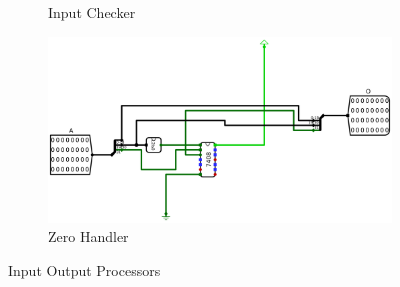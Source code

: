 \documentclass[12pt]{article}
\begin{document}
\begin{figure}[H]
\begin{subfigure}[b]{0.45\textwidth}
        \caption{Input Checker}
        \label{fig:inpcheck}
    \end{subfigure}
    \begin{subfigure}[b]{0.45\textwidth}
        \includegraphics[width=\textwidth]{Images/0handler.png}
        \caption{Zero Handler}
        \label{fig:0handler}
    \end{subfigure}
    \caption{Input Output Processors}\label{fig:ioprocess}
\end{figure}
\end{document}
